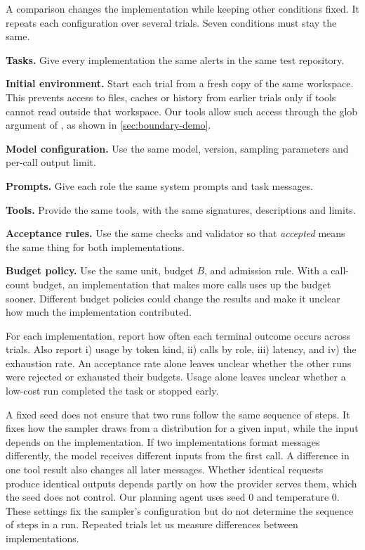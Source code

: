 A comparison changes the implementation while keeping other conditions fixed. It repeats each
configuration over several trials. Seven conditions must stay the same.

\bi

\item \textbf{Tasks.} Give every implementation the same alerts in the same test repository.

\item \textbf{Initial environment.} Start each trial from a fresh copy of the same workspace.
This prevents access to files, caches or history from earlier trials only if tools cannot read
outside that workspace. Our tools allow such access through the glob argument of
, as shown in \cref{sec:boundary-demo}.

\item \textbf{Model configuration.} Use the same model, version, sampling parameters and per-call
output limit.

\item \textbf{Prompts.} Give each role the same system prompts and task messages.

\item \textbf{Tools.} Provide the same tools, with the same signatures, descriptions and limits.

\item \textbf{Acceptance rules.} Use the same checks and validator so that \emph{accepted} means
the same thing for both implementations.

\item \textbf{Budget policy.} Use the same unit, budget $B$, and admission rule. With a call-count
budget, an implementation that makes more calls uses up the budget sooner. Different budget policies could change the
results and make it unclear how much the implementation contributed.

\ei

For each implementation, report how often each terminal outcome occurs across trials. Also report
i) usage by token kind, ii) calls by role, iii) latency, and iv) the exhaustion rate. An acceptance
rate alone leaves unclear whether the other runs were rejected or exhausted their budgets. Usage
alone leaves unclear whether a low-cost run completed the task or stopped early.

A fixed seed does not ensure that two runs follow the same sequence of steps. It fixes how the
sampler draws from a distribution for a given input, while the input depends on the
implementation. If two implementations format messages differently, the model receives different
inputs from the first call. A difference in one tool result also changes all later messages.
Whether identical requests produce identical outputs depends partly on how the provider serves
them, which the seed does not control. Our planning agent uses seed 0 and temperature 0. These
settings fix the sampler's configuration but do not determine the sequence of steps in a run.
Repeated trials let us measure differences between implementations.

